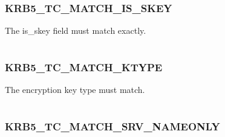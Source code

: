 \documentclass[letterpaper,10pt,english]{sphinxmanual}
\begin{document}
\subsubsection{KRB5\_TC\_MATCH\_IS\_SKEY}
\label{appdev/refs/macros/KRB5_TC_MATCH_IS_SKEY:krb5-tc-match-is-skey}\label{appdev/refs/macros/KRB5_TC_MATCH_IS_SKEY:krb5-tc-match-is-skey-data}\label{appdev/refs/macros/KRB5_TC_MATCH_IS_SKEY::doc}

\begin{fulllineitems}
\label{appdev/refs/macros/KRB5_TC_MATCH_IS_SKEY:KRB5_TC_MATCH_IS_SKEY}
\end{fulllineitems}


The is\_skey field must match exactly.

\begin{tabulary}{\linewidth}{|L|L|}
\hline

 & 
\\
\hline\end{tabulary}



\subsubsection{KRB5\_TC\_MATCH\_KTYPE}
\label{appdev/refs/macros/KRB5_TC_MATCH_KTYPE:krb5-tc-match-ktype}\label{appdev/refs/macros/KRB5_TC_MATCH_KTYPE:krb5-tc-match-ktype-data}\label{appdev/refs/macros/KRB5_TC_MATCH_KTYPE::doc}

\begin{fulllineitems}
\label{appdev/refs/macros/KRB5_TC_MATCH_KTYPE:KRB5_TC_MATCH_KTYPE}
\end{fulllineitems}


The encryption key type must match.

\begin{tabulary}{\linewidth}{|L|L|}
\hline

 & 
\\
\hline\end{tabulary}



\subsubsection{KRB5\_TC\_MATCH\_SRV\_NAMEONLY}
\label{appdev/refs/macros/KRB5_TC_MATCH_SRV_NAMEONLY::doc}\label{appdev/refs/macros/KRB5_TC_MATCH_SRV_NAMEONLY:krb5-tc-match-srv-nameonly}\label{appdev/refs/macros/KRB5_TC_MATCH_SRV_NAMEONLY:krb5-tc-match-srv-nameonly-data}
\end{document}
